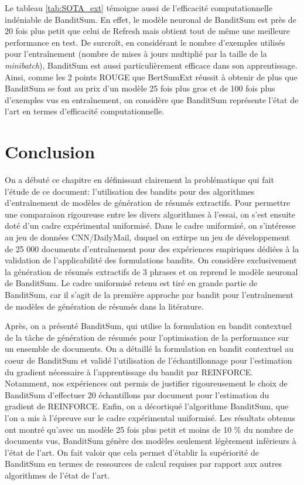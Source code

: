 Le tableau \ref{tab:SOTA_ext} témoigne aussi 
de l'efficacité computationnelle indéniable 
de BanditSum.
En effet, le modèle neuronal de BanditSum est près de 20 
fois plus petit que celui de Refresh mais obtient 
tout de même une meilleure performance en test.
De surcroît, en considérant le nombre d'exemples utilisés 
pour l'entraînement (nombre de mises à jours multiplié 
par la taille de la \textit{minibatch}), BanditSum 
est aussi particulièrement efficace dans son apprentissage.
Ainsi, comme les 2 points ROUGE que BertSumExt réussit 
à obtenir de plus que BanditSum se font au prix 
d'un modèle 25 fois plus gros et de 100 fois plus d'exemples 
vus en entraînement, on considère que BanditSum 
représente l'état de l'art
en termes d'efficacité computationnelle.

\section{Conclusion}

On a débuté ce chapitre en définissant clairement 
la problématique qui fait l'étude de ce document:
l'utilisation des bandits pour des algorithmes 
d'entraînement de modèles de génération de résumés extractifs.
Pour permettre une comparaison rigoureuse entre les 
divers algorithmes à l'essai, on s'est ensuite doté 
d'un cadre expérimental uniformisé.
Dans le cadre uniformisé, on s'intéresse au jeu
de données CNN/DailyMail, duquel on extirpe un jeu 
de développement de 25 000 documents d'entraînement pour des expériences 
empiriques dédiées à la validation de l'applicabilité 
des formulations bandits.
On considère exclusivement la génération de résumés 
extractifs de 3 phrases et on reprend le modèle neuronal
de BanditSum.
Le cadre uniformisé retenu est tiré en grande partie 
de BanditSum, car il s'agit de la première approche 
par bandit pour l'entraînement de modèles de génération 
de résumés dans la litérature.

Après, on a présenté BanditSum, qui utilise la formulation 
en bandit contextuel de la tâche de génération de résumés 
pour l'optimisation de la performance sur un ensemble 
de documents.
On a détaillé la formulation en bandit contextuel
au coeur de BanditSum et validé l'utilisation 
de l'échantillonnage pour l'estimation du gradient nécessaire 
à l'apprentissage du bandit par REINFORCE.
Notamment, nos expériences ont permis de justifier rigoureusement 
le choix de BanditSum d'effectuer 20 échantillons par 
document pour l'estimation du gradient de REINFORCE.
Enfin, on a décortiqué l'algorithme BanditSum, que l'on a
mis à l'épreuve sur le cadre expérimental uniformisé.
Les résultats obtenus ont montré qu'avec un modèle 25 fois 
plus petit et moins de 10 \% du nombre de documents vus,
BanditSum génère des modèles seulement légèrement 
inférieurs à l'état de l'art.
On fait valoir que cela permet d'établir la supériorité 
de BanditSum en termes de ressources de calcul requises par rapport aux
autres algorithmes de l'état de l'art.
